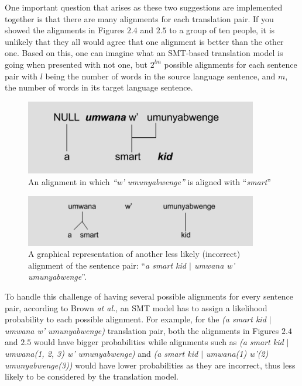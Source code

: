 One important question that arises as these two suggestions are implemented together is that there are many alignments for each translation pair. If you showed the alignments in Figures $2.4$ and $2.5$ to a group of ten people, it is unlikely that they all would agree that one alignment is better than the other one. Based on this, one can imagine what an SMT-based translation model is going when presented with not one, but $2^{lm}$ possible alignments for each sentence pair with $l$ being the number of words in the source language sentence, and $m$, the number of words in its target language sentence. 
\begin{figure}[h]
\begin{center}
\includegraphics[width=4in]{figures/fig-four.png}
\caption{An alignment in which \textit{``w' umunyabwenge''} is aligned with ``\textit{smart}''}
\end{center}
\end{figure}
\begin{figure}[h]
\begin{center}
\includegraphics[width=4in]{figures/fig-five.png}
\caption{A graphical representation of another less likely (incorrect) alignment of the sentence pair: ``\textit{a smart kid $|$  umwana w' umunyabwenge}''.}
\end{center}
\end{figure}

To handle this challenge of having several possible alignments for every sentence pair, according to Brown \textit{at al.}\cite[p. 269-270]{brown1993mathematics}, an SMT model has to assign a likelihood probability to each possible alignment. For example, for the \textit{(a smart kid $|$ umwana w' umunyabwenge)} translation pair, both the alignments in Figures $2.4$ and $2.5$ would have bigger probabilities while alignments such as \textit{(a smart kid $|$ umwana(1, 2, 3) w' umunyabwenge)} and \textit{(a smart kid $|$ umwana(1) w'(2) umunyabwenge(3))} would have lower probabilities as they are incorrect, thus less likely to be considered by the translation model.

